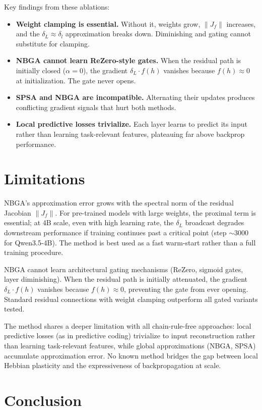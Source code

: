 \documentclass[11pt]{article}
\begin{document}
Key findings from these ablations:
\begin{itemize}
\item \textbf{Weight clamping is essential.} Without it, weights grow, $\|J_f\|$ increases, and the $\delta_L \approx \delta_l$ approximation breaks down. Diminishing and gating cannot substitute for clamping.
\item \textbf{NBGA cannot learn ReZero-style gates.} When the residual path is initially closed ($\alpha=0$), the gradient $\delta_L \cdot f(h)$ vanishes because $f(h) \approx 0$ at initialization. The gate never opens.
\item \textbf{SPSA and NBGA are incompatible.} Alternating their updates produces conflicting gradient signals that hurt both methods.
\item \textbf{Local predictive losses trivialize.} Each layer learns to predict its input rather than learning task-relevant features, plateauing far above backprop performance.
\end{itemize}

\section{Limitations}

NBGA's approximation error grows with the spectral norm of the residual Jacobian $\|J_f\|$. For pre-trained models with large weights, the proximal term is essential; at 4B scale, even with high learning rate, the $\delta_L$ broadcast degrades downstream performance if training continues past a critical point (step $\sim$3000 for Qwen3.5-4B). The method is best used as a fast warm-start rather than a full training procedure.

NBGA cannot learn architectural gating mechanisms (ReZero, sigmoid gates, layer diminishing). When the residual path is initially attenuated, the gradient $\delta_L \cdot f(h)$ vanishes because $f(h) \approx 0$, preventing the gate from ever opening. Standard residual connections with weight clamping outperform all gated variants tested.

The method shares a deeper limitation with all chain-rule-free approaches: local predictive losses (as in predictive coding) trivialize to input reconstruction rather than learning task-relevant features, while global approximations (NBGA, SPSA) accumulate approximation error. No known method bridges the gap between local Hebbian plasticity and the expressiveness of backpropagation at scale.

\section{Conclusion}
\end{document}
